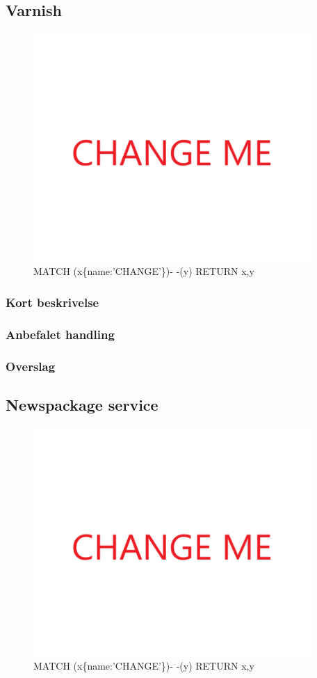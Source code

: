 \documentclass{article}
\begin{document}
\subsection{Varnish}
\begin{figure}[h]
\includegraphics[width=300pt]{CHANGE.PNG}
\caption{MATCH (x\{name:'CHANGE'\})- -(y) RETURN x,y}
\end{figure}
\subsubsection{Kort beskrivelse}
\subsubsection{Anbefalet handling}
\subsubsection{Overslag}


\subsection{Newspackage service}
\begin{figure}[h]
\includegraphics[width=300pt]{CHANGE.PNG}
\caption{MATCH (x\{name:'CHANGE'\})- -(y) RETURN x,y}
\end{figure}
\end{document}
